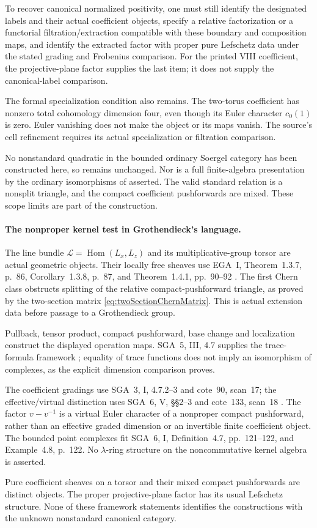 To recover canonical normalized positivity, one must still
identify the designated labels and their actual coefficient
objects, specify a relative factorization or a functorial
filtration/extraction compatible with these boundary and
composition maps, and identify the extracted factor with
proper pure Lefschetz data under the stated grading and
Frobenius comparison.
For the printed VIII coefficient, the projective-plane
factor supplies the last item; it does not supply the
canonical-label comparison.

The formal specialization condition also remains.
The two-torus coefficient has nonzero total cohomology
dimension four, even though its Euler character
\(c_0(1)\) is zero. Euler vanishing does not make the
object or its maps vanish. The source's cell refinement
requires its actual specialization or filtration comparison.

No nonstandard quadratic in the bounded ordinary Soergel
category has been constructed here, so  remains
unchanged. Nor is a full finite-algebra presentation by the
ordinary isomorphisms of  asserted. The valid
standard relation is a nonsplit triangle, and the compact
coefficient pushforwards are mixed. These scope limits are
part of the construction.

\paragraph{The nonproper kernel test in Grothendieck's language.}
The line bundle
\(\mathcal L=\operatorname{Hom}(L_x,L_z)\) and its
multiplicative-group torsor are actual geometric objects.
Their locally free sheaves use EGA~I, Theorem~1.3.7, p.~86,
Corollary~1.3.8, p.~87, and Theorem~1.4.1, pp.~90--92
\cite{EGA}. The first Chern class obstructs splitting of
the relative compact-pushforward triangle, as proved by
the two-section matrix \eqref{eq:twoSectionChernMatrix}.
This is actual extension data before passage to a
Grothendieck group.

Pullback, tensor product, compact pushforward, base change
and localization construct the displayed operation maps.
SGA~5, III, 4.7 supplies the trace-formula framework
\cite{SGA5}; equality of trace functions does not imply
an isomorphism of complexes, as the explicit dimension
comparison proves.

The coefficient gradings use SGA~3, I, 4.7.2--3 and
cote~90, scan~17; the effective/virtual distinction uses
SGA~6, V, \S\S2--3 and cote~133, scan~18
\cite{SGA3,SGA6,Archive}.
The factor \(v-v^{-1}\) is a virtual Euler character
of a nonproper compact pushforward, rather than an
effective graded dimension or an invertible finite
coefficient object. The bounded point complexes fit
SGA~6, I, Definition~4.7, pp.~121--122, and
Example~4.8, p.~122.
No \(\lambda\)-ring structure on the noncommutative
kernel algebra is asserted.

Pure coefficient sheaves on a torsor and their mixed
compact pushforwards are distinct objects. The proper
projective-plane factor has its usual Lefschetz
structure. None of these framework statements identifies
the constructions with the unknown nonstandard canonical
category.

